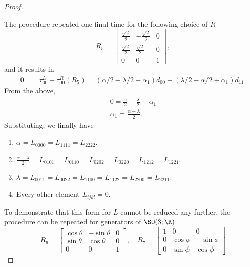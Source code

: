 \begin{proof}
\begin{enumerate}
    \end{enumerate}
    The procedure repeated one final time for the following choice of $R$
    \begin{equation}
        R_5 = \begin{bmatrix}
            \frac{\sqrt{2}}{2} & -\frac{\sqrt{2}}{2} & 0 \\
            \frac{\sqrt{2}}{2} &  \frac{\sqrt{2}}{2} & 0 \\
            0 & 0 & 1
        \end{bmatrix},
    \end{equation}
    and it results in
    \begin{align}
        0 &= \tau^L_{00} - \tau^R_{00}(R_5) = (\alpha/2 - \lambda/2 - \alpha_{1})d_{00} + (\lambda/2 - \alpha/2 + \alpha_{1})d_{11}.
    \end{align}
    From the above,
    \begin{align}
        0 = \frac{\alpha}{2} - \frac{\lambda}{2} - \alpha_{1} \\
        \alpha_{1} = \frac{\alpha - \lambda}{2}.
    \end{align}
    Substituting, we finally have
    \begin{enumerate}
        \item $\alpha = L_{0000} = L_{1111} = L_{2222}$.
        \item $\frac{\alpha - \lambda}{2} = L_{0101} = L_{0110} = L_{0202} = L_{0220} = L_{1212} = L_{1221}$.
        \item $\lambda = L_{0011} = L_{0022} = L_{1100} = L_{1122} = L_{2200} = L_{2211}$.
        \item Every other element $L_{ijkl}=0$.
    \end{enumerate}
    To demonstrate that this form for $L$ cannot be reduced any further, the procedure
    can be repeated for generators of $\SO(3;\R)$
    \begin{equation}
        R_6 = \begin{bmatrix}
            \cos\theta & -\sin\theta & 0 \\
            \sin\theta & \cos\theta & 0 \\
            0 & 0 & 1
        \end{bmatrix}, \quad
        R_7 = \begin{bmatrix}
            1 & 0 & 0 \\
            0 & \cos\phi & -\sin\phi \\
            0 & \sin\phi & \cos\phi
        \end{bmatrix}

\end{equation}
\end{proof}
